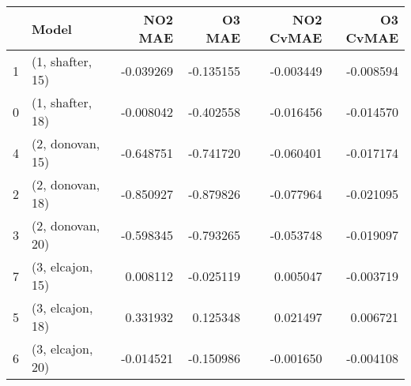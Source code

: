 \begin{tabular}{llrrrr}
\toprule
{} &             Model &   NO2 MAE &    O3 MAE &  NO2 CvMAE &  O3 CvMAE \\
\midrule
1 &  (1, shafter, 15) & -0.039269 & -0.135155 &  -0.003449 & -0.008594 \\
0 &  (1, shafter, 18) & -0.008042 & -0.402558 &  -0.016456 & -0.014570 \\
4 &  (2, donovan, 15) & -0.648751 & -0.741720 &  -0.060401 & -0.017174 \\
2 &  (2, donovan, 18) & -0.850927 & -0.879826 &  -0.077964 & -0.021095 \\
3 &  (2, donovan, 20) & -0.598345 & -0.793265 &  -0.053748 & -0.019097 \\
7 &  (3, elcajon, 15) &  0.008112 & -0.025119 &   0.005047 & -0.003719 \\
5 &  (3, elcajon, 18) &  0.331932 &  0.125348 &   0.021497 &  0.006721 \\
6 &  (3, elcajon, 20) & -0.014521 & -0.150986 &  -0.001650 & -0.004108 \\
\bottomrule
\end{tabular}
